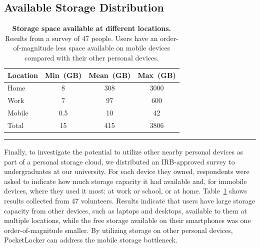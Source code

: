 \subsection{Available Storage Distribution}

\begin{table}[t]
{\small
\begin{tabularx}{\textwidth}{Xccc}

\textbf{Location} & \textbf{Min~(GB)} & \textbf{Mean~(GB)} &
\textbf{Max~(GB)} \\ \toprule
Home & 8 & 308 & 3000 \\
Work & 7 & 97 & 600 \\
Mobile & 0.5 & 10 & 42 \\
Total & 15 & 415 & 3806 \\

\end{tabularx}
}
\vspace*{-0.1in}
\caption{\small \textbf{Storage space available at different locations.}
Results from a survey of 47 people. Users have an order-of-magnitude less
space available on mobile devices compared with their other personal
devices.}

\label{table-storagesurvey}
  
\vspace*{0.05in}

\hrule

\vspace*{-0.2in}

\end{table}

Finally, to investigate the potential to utilize other nearby personal
devices as part of a personal storage cloud, we distributed an IRB-approved
survey to undergraduates at our university. For each device they owned,
respondents were asked to indicate how much storage capacity it had available
and, for immobile devices, where they used it most: at work or school, or at
home. Table~\ref{table-storagesurvey} shows results collected from 47
volunteers. Results indicate that users have large storage capacity from
other devices, such as laptops and desktops, available to them at multiple
locations, while the free storage available on their smartphones was one
order-of-magnitude smaller. By utilizing storage on other personal devices,
PocketLocker can address the mobile storage bottleneck.

